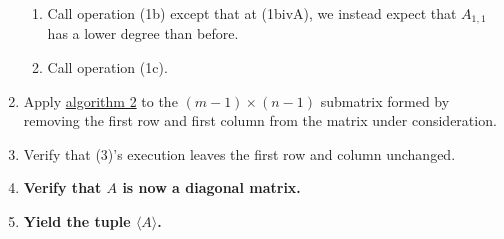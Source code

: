 \documentclass[twocolumn]{article}
\begin{document}
\begin{enumerate}
\begin{enumerate}
						\item Call operation (1b) except that at (1bivA), we instead expect that $A_{1,1}$ has a lower degree than before.
						\item Call operation (1c).
					\end{enumerate}
				\item Apply \hyperref[sec:algorithm 2]{algorithm 2} to the $(m-1)\times(n-1)$ submatrix formed by removing the first row and first column from the matrix under consideration.
				\item Verify that (3)'s execution leaves the first row and column unchanged.
				\item \textbf{Verify that $A$ is now a diagonal matrix.}
				\item \textbf{Yield the tuple $\langle A\rangle$.}
			\end{enumerate}
\end{document}
